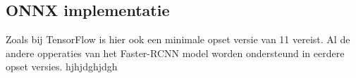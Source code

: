 \subsection{ONNX implementatie}
Zoals bij TensorFlow is hier ook een minimale opset versie van 11 vereist.
Al de andere opperaties van het Faster-RCNN model worden ondersteund in eerdere opset versies.
hjhjdghjdgh

